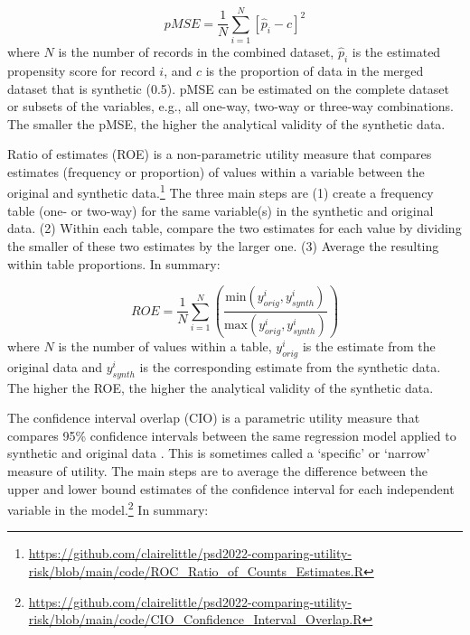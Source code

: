 \documentclass[runningheads]{llncs}
\begin{document}
\begin{equation}
pMSE = \frac{1}{N}\sum_{i=1}^{N}[\hat{p}_i - c]^2
\end{equation}
where $N$ is the number of records in the combined dataset, $\hat{p}_i$ is the estimated propensity score for record $i$, and $c$ is the proportion of data in the merged dataset that is synthetic (0.5). pMSE can be estimated on the complete dataset or subsets of the variables, e.g., all one-way, two-way or three-way combinations. The smaller the pMSE, the higher the analytical validity of the synthetic data.

Ratio of estimates (ROE) is a non-parametric utility measure that compares estimates (frequency or proportion) of values within a variable between the original and synthetic data.\footnote{\url{https://github.com/clairelittle/psd2022-comparing-utility-risk/blob/main/code/ROC_Ratio_of_Counts_Estimates.R}}  The three main steps are (1) create a frequency table (one- or two-way) for the same variable(s) in the synthetic and original data.  (2) Within each table, compare the two estimates for each value by dividing the smaller of these two estimates by the larger one.  (3) Average the resulting within table proportions.  In summary:

\begin{equation}
    ROE = \frac{1}{N} \sum^{N}_{i=1} \left( \frac{\text{min}(y_{orig}^i,y_{synth}^i)}{\text{max}(y_{orig}^i,y_{synth}^i)} \right)
\end{equation}
where $N$ is the number of values within a table, $y^i_{orig}$ is the estimate from the original data and $y^i_{synth}$ is the corresponding estimate from the synthetic data.  The higher the ROE, the higher the analytical validity of the synthetic data.  

The confidence interval overlap (CIO) is a parametric utility measure that compares 95\% confidence intervals between the same regression model applied to synthetic and original data \cite{karr2006framework}.  This is sometimes called a `specific'\cite{snoke2018general} or `narrow'\cite{drechsler2009disclosure} measure of utility.  The main steps are to average the difference between the upper and lower bound estimates of the confidence interval for each independent variable in the model.\footnote{\url{https://github.com/clairelittle/psd2022-comparing-utility-risk/blob/main/code/CIO_Confidence_Interval_Overlap.R}} In summary:
\end{document}
